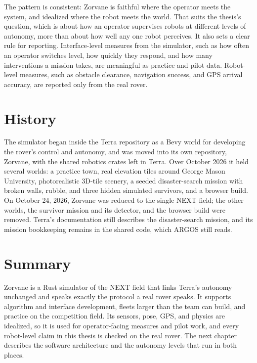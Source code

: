 The pattern is consistent: Zorvane is faithful where the operator meets the system, and idealized where the robot meets the world.
That suits the thesis's question, which is about how an operator supervises robots at different levels of autonomy, more than about how well any one robot perceives.
It also sets a clear rule for reporting.
Interface-level measures from the simulator, such as how often an operator switches level, how quickly they respond, and how many interventions a mission takes, are meaningful as practice and pilot data.
Robot-level measures, such as obstacle clearance, navigation success, and GPS arrival accuracy, are reported only from the real rover.

\section{History}
\label{sec:sim-history}

The simulator began inside the Terra repository as a Bevy world for developing the rover's control and autonomy, and was moved into its own repository, Zorvane, with the shared robotics crates left in Terra.
Over October 2026 it held several worlds: a practice town, real elevation tiles around George Mason University, photorealistic 3D-tile scenery, a seeded disaster-search mission with broken walls, rubble, and three hidden simulated survivors, and a browser build.
On October 24, 2026, Zorvane was reduced to the single NEXT field; the other worlds, the survivor mission and its detector, and the browser build were removed.
Terra's documentation still describes the disaster-search mission, and its mission bookkeeping remains in the shared code, which ARGOS still reads.

\section{Summary}

Zorvane is a Rust simulator of the NEXT field that links Terra's autonomy unchanged and speaks exactly the protocol a real rover speaks.
It supports algorithm and interface development, fleets larger than the team can build, and practice on the competition field.
Its sensors, pose, GPS, and physics are idealized, so it is used for operator-facing measures and pilot work, and every robot-level claim in this thesis is checked on the real rover.
The next chapter describes the software architecture and the autonomy levels that run in both places.
